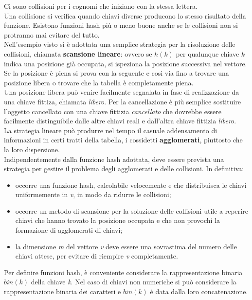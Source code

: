 \documentclass[12pt]{report}
\begin{document}
	Ci sono collisioni per i cognomi che iniziano con la stessa lettera. \\
	Una collisione si verifica quando chiavi diverse producono lo stesso risultato della funzione. Esistono funzioni hash più o meno buone anche se le collisioni non si protranno mai evitare del tutto. \\
	Nell'esempio visto si è adottata una semplice strategia per la risoluzione delle collisioni, chiamata \textbf{scansione lineare}: ovvero se $h(k)$ per qualunque chiave $k$ indica una posizione già occupata, si ispeziona la posizione successiva nel vettore. Se la posizione è piena si prova con la seguente e così via fino a trovare una posizione libera o trovare che la tabella è completamente piena. \\
	Una posizione libera può venire facilmente segnalata in fase di realizzazione da una chiave fittiza, chiamata \textit{libero}. Per la cancellazione è più semplice sostituire l'oggetto cancellato con una chiave fittizia \textit{cancellato} che dovrebbe essere facilmente distinguibile dalle altre chiavi reali e dall'altra chiave fittizia \textit{libero}. \\
	La strategia lineare può produrre nel tempo il casuale addensamento di informazioni in certi tratti della tabella, i cossidetti \textbf{agglomerati}, piuttosto che la loro dispersione. \\
	Indipendentemente dalla funzione hash adottata, deve essere prevista una strategia per gestire il problema degli agglomerati e delle collisioni. In definitiva:
	\begin{itemize}
		\item occorre una funzione hash, calcolabile velocemente e che distribuisca le chiavi uniformemente in \textit{v}, in modo da ridurre le collisioni;
		\item occorre un metodo di scansione per la soluzione delle collisioni utile a reperire chiavi che hanno trovato la posizione occupata e che non provochi la formazione di agglomerati di chiavi;
		\item la dimensione \textit{m} del vettore \textit{v} deve essere una sovrastima del numero delle chiavi attese, per evitare di riempire \textit{v} completamente.
	\end{itemize}
	Per definire funzioni hash, è conveniente considerare la rappresentazione binaria $bin(k)$ della chiave \textit{k}. Nel caso di chiavi non numeriche si può considerare la rappresentazione binaria dei caratteri e $bin(k)$ è data dalla loro concatenazione. \\
\end{document}
